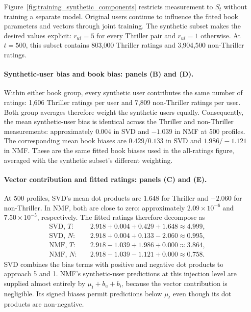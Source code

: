 \documentclass[information,article,submit,pdftex,moreauthors]{Definitions/mdpi}
\begin{document}
Figure~\ref{fig:training_synthetic_components} restricts measurement to $S_t$ without training a separate model. Original users continue to influence the fitted book parameters and vectors through joint training. The synthetic subset makes the desired values explicit: $r_{ui}=5$ for every Thriller pair and $r_{ui}=1$ otherwise. At $t=500$, this subset contains 803,000 Thriller ratings and 3,904,500 non-Thriller ratings.

\paragraph{Synthetic-user bias and book bias: panels (B) and (D).}
Within either book group, every synthetic user contributes the same number of ratings: 1,606 Thriller ratings per user and 7,809 non-Thriller ratings per user. Both group averages therefore weight the synthetic users equally. Consequently, the mean synthetic-user bias is identical across the Thriller and non-Thriller measurements: approximately 0.004 in SVD and $-1.039$ in NMF at 500 profiles. The corresponding mean book biases are $0.429/0.133$ in SVD and $1.986/-1.121$ in NMF. These are the same fitted book biases used in the all-ratings figure, averaged with the synthetic subset's different weighting.

\paragraph{Vector contribution and fitted ratings: panels (C) and (E).}
At 500 profiles, SVD's mean dot products are 1.648 for Thriller and $-2.060$ for non-Thriller. In NMF, both are close to zero: approximately $2.09\times10^{-6}$ and $7.50\times10^{-5}$, respectively. The fitted ratings therefore decompose as
\begin{equation}
\label{eq:training_synthetic_numeric}
\begin{aligned}
\text{SVD, }T:&\quad 2.918+0.004+0.429+1.648\approx4.999,\\
\text{SVD, }N:&\quad 2.918+0.004+0.133-2.060\approx0.995,\\
\text{NMF, }T:&\quad 2.918-1.039+1.986+0.000\approx3.864,\\
\text{NMF, }N:&\quad 2.918-1.039-1.121+0.000\approx0.758.
\end{aligned}
\end{equation}
SVD combines the bias terms with positive and negative dot products to approach 5 and 1. NMF's synthetic-user predictions at this injection level are supplied almost entirely by $\mu_t+b_u+b_i$, because the vector contribution is negligible. Its signed biases permit predictions below $\mu_t$ even though its dot products are non-negative.
\end{document}
